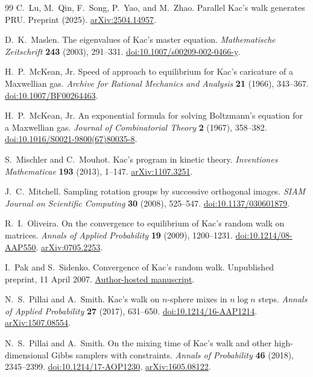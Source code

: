 \documentclass[11pt]{article}
\theoremstyle{definition}\newtheorem{definition}[theorem]{Definition}
\theoremstyle{remark}\newtheorem{remark}[theorem]{Remark}
\begin{document}
\begin{thebibliography}{99}
 C.~Lu, M.~Qin, F.~Song, P.~Yao, and M.~Zhao.
Parallel Kac's walk generates PRU.
Preprint (2025). \href{https://arxiv.org/abs/2504.14957}{arXiv:2504.14957}.

 D.~K.~Maslen.
The eigenvalues of Kac's master equation.
\emph{Mathematische Zeitschrift} \textbf{243} (2003), 291--331.
\href{https://doi.org/10.1007/s00209-002-0466-y}{doi:10.1007/s00209-002-0466-y}.

 H.~P.~McKean, Jr.
Speed of approach to equilibrium for Kac's caricature of a Maxwellian gas.
\emph{Archive for Rational Mechanics and Analysis} \textbf{21} (1966), 343--367.
\href{https://doi.org/10.1007/BF00264463}{doi:10.1007/BF00264463}.

 H.~P.~McKean, Jr.
An exponential formula for solving Boltzmann's equation for a Maxwellian gas.
\emph{Journal of Combinatorial Theory} \textbf{2} (1967), 358--382.
\href{https://doi.org/10.1016/S0021-9800(67)80035-8}{doi:10.1016/S0021-9800(67)80035-8}.

 S.~Mischler and C.~Mouhot.
Kac's program in kinetic theory.
\emph{Inventiones Mathematicae} \textbf{193} (2013), 1--147.
\href{https://arxiv.org/abs/1107.3251}{arXiv:1107.3251}.

 J.~C.~Mitchell.
Sampling rotation groups by successive orthogonal images.
\emph{SIAM Journal on Scientific Computing} \textbf{30} (2008), 525--547.
\href{https://doi.org/10.1137/030601879}{doi:10.1137/030601879}.

 R.~I.~Oliveira.
On the convergence to equilibrium of Kac's random walk on matrices.
\emph{Annals of Applied Probability} \textbf{19} (2009), 1200--1231.
\href{https://doi.org/10.1214/08-AAP550}{doi:10.1214/08-AAP550}.
\href{https://arxiv.org/abs/0705.2253}{arXiv:0705.2253}.

 I.~Pak and S.~Sidenko.
Convergence of Kac's random walk.
Unpublished preprint, 11 April 2007.
\href{https://www.math.ucla.edu/~pak/papers/psid3.pdf}{Author-hosted manuscript}.

 N.~S.~Pillai and A.~Smith.
Kac's walk on $n$-sphere mixes in $n\log n$ steps.
\emph{Annals of Applied Probability} \textbf{27} (2017), 631--650.
\href{https://doi.org/10.1214/16-AAP1214}{doi:10.1214/16-AAP1214}.
\href{https://arxiv.org/abs/1507.08554}{arXiv:1507.08554}.

 N.~S.~Pillai and A.~Smith.
On the mixing time of Kac's walk and other high-dimensional Gibbs samplers with constraints.
\emph{Annals of Probability} \textbf{46} (2018), 2345--2399.
\href{https://doi.org/10.1214/17-AOP1230}{doi:10.1214/17-AOP1230}.
\href{https://arxiv.org/abs/1605.08122}{arXiv:1605.08122}.


\end{thebibliography}
\end{document}
